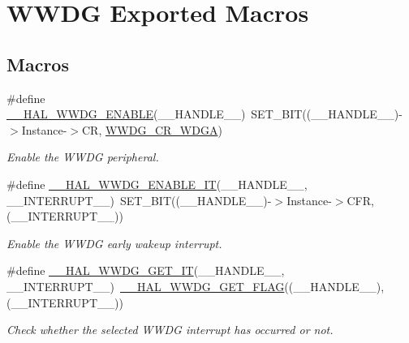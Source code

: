 \hypertarget{group___w_w_d_g___exported___macros}{}\section{W\+W\+DG Exported Macros}
\label{group___w_w_d_g___exported___macros}
\subsection*{Macros}
\begin{DoxyCompactItemize}
\item 
\#define \hyperlink{group___w_w_d_g___exported___macros_gaad04976da12e2c801c72668b8e100d80}{\+\_\+\+\_\+\+H\+A\+L\+\_\+\+W\+W\+D\+G\+\_\+\+E\+N\+A\+B\+LE}(\+\_\+\+\_\+\+H\+A\+N\+D\+L\+E\+\_\+\+\_\+)~S\+E\+T\+\_\+\+B\+IT((\+\_\+\+\_\+\+H\+A\+N\+D\+L\+E\+\_\+\+\_\+)-\/$>$Instance-\/$>$CR, \hyperlink{group___peripheral___registers___bits___definition_gab647e9997b8b8e67de72af1aaea3f52f}{W\+W\+D\+G\+\_\+\+C\+R\+\_\+\+W\+D\+GA})
\begin{DoxyCompactList}\small\item\em Enable the W\+W\+DG peripheral. \end{DoxyCompactList}\item 
\#define \hyperlink{group___w_w_d_g___exported___macros_ga62d4eb6a7921d6f729e7a69448eac38a}{\+\_\+\+\_\+\+H\+A\+L\+\_\+\+W\+W\+D\+G\+\_\+\+E\+N\+A\+B\+L\+E\+\_\+\+IT}(\+\_\+\+\_\+\+H\+A\+N\+D\+L\+E\+\_\+\+\_\+,  \+\_\+\+\_\+\+I\+N\+T\+E\+R\+R\+U\+P\+T\+\_\+\+\_\+)~S\+E\+T\+\_\+\+B\+IT((\+\_\+\+\_\+\+H\+A\+N\+D\+L\+E\+\_\+\+\_\+)-\/$>$Instance-\/$>$C\+FR, (\+\_\+\+\_\+\+I\+N\+T\+E\+R\+R\+U\+P\+T\+\_\+\+\_\+))
\begin{DoxyCompactList}\small\item\em Enable the W\+W\+DG early wakeup interrupt. \end{DoxyCompactList}\item 
\#define \hyperlink{group___w_w_d_g___exported___macros_ga80eb5c31bde6248b9fe38a6f7bd1710d}{\+\_\+\+\_\+\+H\+A\+L\+\_\+\+W\+W\+D\+G\+\_\+\+G\+E\+T\+\_\+\+IT}(\+\_\+\+\_\+\+H\+A\+N\+D\+L\+E\+\_\+\+\_\+,  \+\_\+\+\_\+\+I\+N\+T\+E\+R\+R\+U\+P\+T\+\_\+\+\_\+)~\hyperlink{group___w_w_d_g___exported___macros_ga60a99447a00a7d95c18637c38147063a}{\+\_\+\+\_\+\+H\+A\+L\+\_\+\+W\+W\+D\+G\+\_\+\+G\+E\+T\+\_\+\+F\+L\+AG}((\+\_\+\+\_\+\+H\+A\+N\+D\+L\+E\+\_\+\+\_\+),(\+\_\+\+\_\+\+I\+N\+T\+E\+R\+R\+U\+P\+T\+\_\+\+\_\+))
\begin{DoxyCompactList}\small\item\em Check whether the selected W\+W\+DG interrupt has occurred or not. \end{DoxyCompactList}\item 

\end{DoxyCompactItemize}
